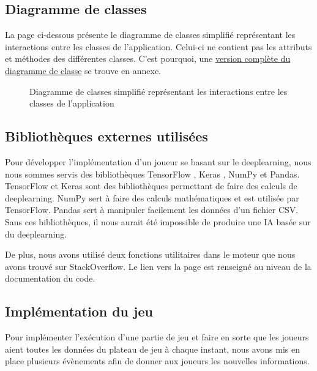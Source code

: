 \subsection{Diagramme de classes}

La page ci-dessous présente le diagramme de classes simplifié représentant les interactions entre les classes de l'application. Celui-ci ne contient pas les attributs et méthodes des différentes classes. C'est pourquoi, une \hyperref[subsec:class-diagram]{version complète du diagramme de classe}  se trouve en annexe.



\begin{figure}[H]
\caption{Diagramme de classes simplifié représentant les interactions entre les classes de l'application}
\label{fig:simplified_class_diagram}
\end{figure}

\subsection{Bibliothèques externes utilisées}

Pour développer l'implémentation d'un joueur se basant sur le deeplearning, nous nous sommes servis des bibliothèques TensorFlow \cite{ref-tensorflow}, Keras \cite{ref-keras}, NumPy \cite{ref-numpy} et Pandas\cite{ref-pandas}. TensorFlow et Keras sont des bibliothèques permettant de faire des calculs de deeplearning. NumPy sert à faire des calculs mathématiques et est utilisée par TensorFlow. Pandas sert à manipuler facilement les données d'un fichier CSV. Sans ces bibliothèques, il nous aurait été impossible de produire une IA basée sur du deeplearning.

De plus, nous avons utilisé deux fonctions utilitaires dans le moteur que nous avons trouvé sur StackOverflow. Le lien vers la page est renseigné au niveau de la documentation du code.

\subsection{Implémentation du jeu}

Pour implémenter l'exécution d'une partie de jeu et faire en sorte que les joueurs aient toutes les données du plateau de jeu à chaque instant, nous avons mis en place plusieurs évènements afin de donner aux joueurs les nouvelles informations.

